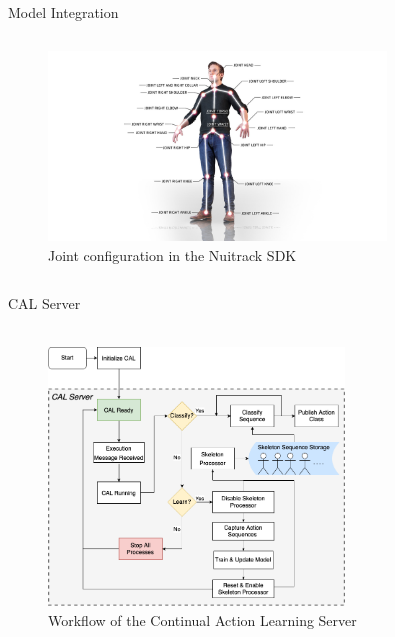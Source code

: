 \documentclass[aspectratio=169, xcolor=dvipsnames]{beamer}
\begin{document}
\begin{frame}{Model Integration}
\begin{columns}
      \begin{figure}[ht!]
            \centering
            \includegraphics[trim=425 100 425 60,clip, width=0.8\textwidth]{images/nt_joints_config.jpeg}
            \caption{Joint configuration in the Nuitrack SDK\footnotemark[7]}
      \end{figure}
      \end{columns}
\end{frame}

\begin{frame}{CAL Server}
      \framesubtitle{}%
      
      \begin{columns}

      \vspace{-1.25cm}
      \begin{figure}[ht!]
            \centering
            \includegraphics[width=0.7\textwidth]{images/CAL_workflow.png}
            \caption{Workflow of the Continual Action Learning Server}
      \end{figure}
      \end{columns}      
\end{frame}
\end{document}
